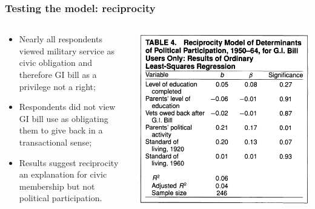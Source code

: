 \documentclass[aspectratio=169]{beamer}
\theoremstyle{principle}
\begin{document}
\begin{frame}
\frametitle{Testing the model: reciprocity}
\begin{columns}
\begin{column}{0.5\textwidth}

\begin{itemize}
\item Nearly all respondents viewed military service as civic obligation and therefore GI bill as a privilege not a right;
\bigskip
\bigskip
\item Respondents did not view GI bill use as obligating them to give back in a transactional sense;
\bigskip
\bigskip
\item Results suggest reciprocity an explanation for civic membership but not political participation.
\end{itemize}
\end{column}
\begin{column}{0.5\textwidth}
\begin{center}
\includegraphics[scale=0.4]{table_4.png}
\end{center}
\end{column}
\end{columns}

\end{frame}
\end{document}
